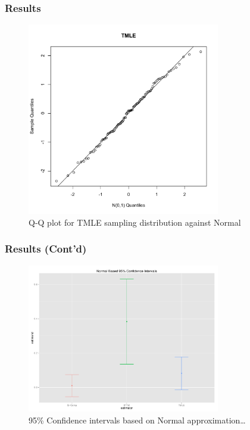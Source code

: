 \documentclass{beamer}
\begin{document}
\begin{frame}
\frametitle{Results}
\begin{figure}
\centering
\includegraphics[width=0.75\textwidth]{tmle_qqplot.pdf}
\caption{Q-Q plot for TMLE sampling distribution against Normal}
\end{figure}
\end{frame}

\begin{frame}
\frametitle{Results (Cont'd)}
\begin{figure}[ht!]
\centering
\includegraphics[width=0.75\textwidth]{bootstrap-normal-ci.pdf}
\caption{95\% Confidence intervals based on Normal approximation\ldots}
\end{figure}
\end{frame}
\end{document}
